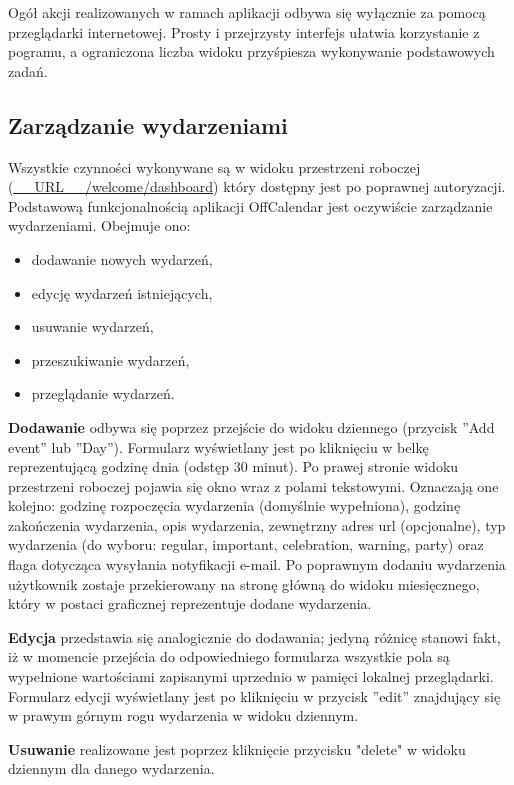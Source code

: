 Ogół akcji realizowanych w ramach aplikacji odbywa się wyłącznie za pomocą przeglądarki internetowej. Prosty i przejrzysty interfejs ułatwia korzystanie z pogramu, a ograniczona liczba widoku przyśpiesza wykonywanie podstawowych zadań.

\subsection{Zarządzanie wydarzeniami}
\label{sec:instrZarzWyd}

Wszystkie czynności wykonywane są w widoku przestrzeni roboczej (\url{__URL__/welcome/dashboard}) który dostępny jest po poprawnej autoryzacji. Podstawową funkcjonalnością aplikacji OffCalendar jest oczywiście zarządzanie wydarzeniami. Obejmuje ono:

\begin{itemize}
\item dodawanie nowych wydarzeń,
\item edycję wydarzeń istniejących,
\item usuwanie wydarzeń,
\item przeszukiwanie wydarzeń,
\item przeglądanie wydarzeń.
\end{itemize}

\textbf{Dodawanie} odbywa się poprzez przejście do widoku dziennego (przycisk ''Add event'' lub ''Day''). Formularz wyświetlany jest po kliknięciu w belkę reprezentującą godzinę dnia (odstęp 30 minut). Po prawej stronie widoku przestrzeni roboczej pojawia się okno wraz z polami tekstowymi. Oznaczają one kolejno: godzinę rozpoczęcia wydarzenia (domyślnie wypełniona), godzinę zakończenia wydarzenia, opis wydarzenia, zewnętrzny adres url (opcjonalne), typ wydarzenia (do wyboru: regular, important, celebration, warning, party) oraz flaga dotycząca wysyłania notyfikacji e-mail. Po poprawnym dodaniu wydarzenia użytkownik zostaje przekierowany na stronę główną do widoku miesięcznego, który w postaci graficznej reprezentuje dodane wydarzenia.

\textbf{Edycja} przedstawia się analogicznie do dodawania; jedyną różnicę stanowi fakt, iż w momencie przejścia do odpowiedniego formularza wszystkie pola są wypełnione wartościami zapisanymi uprzednio w pamięci lokalnej przeglądarki. Formularz edycji wyświetlany jest po kliknięciu w przycisk ''edit'' znajdujący się w prawym górnym rogu wydarzenia w widoku dziennym.

\textbf{Usuwanie} realizowane jest poprzez kliknięcie przycisku "delete"{} w widoku dziennym dla danego wydarzenia.

